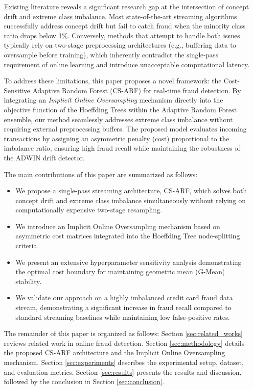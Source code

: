 Existing literature reveals a significant research gap at the intersection of concept drift and extreme class imbalance. Most state-of-the-art streaming algorithms successfully address concept drift but fail to catch fraud when the minority class ratio drops below 1\%. Conversely, methods that attempt to handle both issues typically rely on two-stage preprocessing architectures (e.g., buffering data to oversample before training), which inherently contradict the single-pass requirement of online learning and introduce unacceptable computational latency.

To address these limitations, this paper proposes a novel framework: the Cost-Sensitive Adaptive Random Forest (CS-ARF) for real-time fraud detection. By integrating an \textit{Implicit Online Oversampling} mechanism directly into the objective function of the Hoeffding Trees within the Adaptive Random Forest ensemble, our method seamlessly addresses extreme class imbalance without requiring external preprocessing buffers. The proposed model evaluates incoming transactions by assigning an asymmetric penalty (cost) proportional to the imbalance ratio, ensuring high fraud recall while maintaining the robustness of the ADWIN drift detector. 

The main contributions of this paper are summarized as follows:
\begin{itemize}
    \item We propose a single-pass streaming architecture, CS-ARF, which solves both concept drift and extreme class imbalance simultaneously without relying on computationally expensive two-stage resampling.
    \item We introduce an Implicit Online Oversampling mechanism based on asymmetric cost matrices integrated into the Hoeffding Tree node-splitting criteria.
    \item We present an extensive hyperparameter sensitivity analysis demonstrating the optimal cost boundary for maintaining geometric mean (G-Mean) stability.
    \item We validate our approach on a highly imbalanced credit card fraud data stream, demonstrating a significant increase in fraud recall compared to standard streaming baselines while maintaining low false-positive rates.
\end{itemize}

The remainder of this paper is organized as follows: Section \ref{sec:related_works} reviews related work in online fraud detection. Section \ref{sec:methodology} details the proposed CS-ARF architecture and the Implicit Online Oversampling mechanism. Section \ref{sec:experiments} describes the experimental setup, dataset, and evaluation metrics. Section \ref{sec:results} presents the results and discussion, followed by the conclusion in Section \ref{sec:conclusion}.

